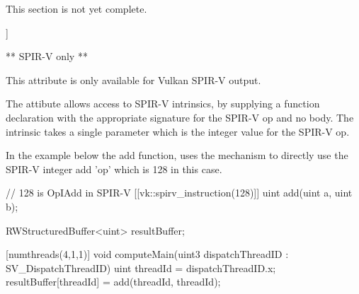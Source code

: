 
\begin{Note} 
This section is not yet complete.
\end{Note}


\begin{codeblock}
[[vk::spirv_instruction]]
\end{codeblock}

** SPIR-V only **

This attribute is only available for Vulkan SPIR-V output.

The attibute allows access to SPIR-V intrinsics, by supplying a function declaration with the appropriate signature for the SPIR-V op and no body. The intrinsic takes a single parameter which is the integer value for the SPIR-V op. 

In the example below the add function, uses the mechanism to directly use the SPIR-V integer add 'op' which is 128 in this case.

\begin{codeblock}
// 128 is OpIAdd in SPIR-V
[[vk::spirv_instruction(128)]]
uint add(uint a, uint b);

RWStructuredBuffer<uint> resultBuffer;

[numthreads(4,1,1)]
void computeMain(uint3 dispatchThreadID : SV_DispatchThreadID)
{
    uint threadId = dispatchThreadID.x;
    resultBuffer[threadId] = add(threadId, threadId);
}
\end{codeblock}

